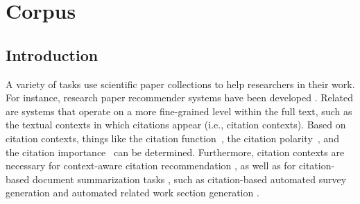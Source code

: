 \chapter{Corpus}




\section{Introduction}
A variety of tasks use scientific paper collections to help researchers in their work. For instance, research paper recommender systems have been developed \cite{Beel2016fixed}. Related are systems that operate on a more fine-grained level within the full text, such as the textual contexts in which citations appear (i.e., citation contexts). 
Based on citation contexts, things like the citation function~\cite{Teufel2006EMNLP,Teufel2006fixed,Moravcsik1975}, the citation polarity~\cite{GhoshD017,Abu-Jbara2013fixed}, and the citation importance~\cite{Valenzuela2015fixed,Chakraborty2016} can be determined. Furthermore, citation contexts are necessary for context-aware citation recommendation \cite{He2010WWW,Ebensu2017}, as well as for citation-based document summarization tasks \cite{Chandrasekaran2019}, such as citation-based automated survey generation \cite{Mohammad2009} and automated related work section generation \cite{Jinggiang2007}.


